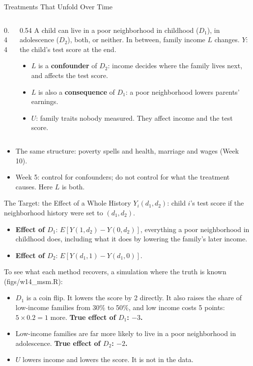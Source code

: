 \documentclass[aspectratio=169,11pt,xcolor=dvipsnames]{beamer}
\newcommand{\srcp}[1]{{\scriptsize\color{gray}(#1)}}
\begin{document}
\begin{frame}{Treatments That Unfold Over Time}
\begin{columns}[c]
\begin{column}{0.44\linewidth}
\begin{center}
\msmdag{}
\end{center}
\end{column}
\begin{column}{0.54\linewidth}
A child can live in a poor neighborhood in childhood ($D_1$), in adolescence ($D_2$), both, or
neither. In between, family income $L$ changes. $Y$: the child's test score at the end.
\begin{itemize}\itemsep2pt
  \item $L$ is a \textbf{confounder} of $D_2$: income decides where the family lives next, and
        affects the test score.
  \item $L$ is also a \textbf{consequence} of $D_1$: a poor neighborhood lowers parents' earnings.
  \item $U$: family traits nobody measured. They affect income and the test score.
\end{itemize}
\end{column}
\end{columns}
\begin{itemize}\itemsep2pt
  \item The same structure: poverty spells and health, marriage and wages (Week 10).
  \item Week 5: control for confounders; do not control for what the treatment causes. Here $L$ is both.
\end{itemize}
\end{frame}

\begin{frame}{The Target: the Effect of a Whole History}
$Y_i(d_1, d_2)$: child $i$'s test score if the neighborhood history were set to $(d_1, d_2)$.
\begin{itemize}\itemsep5pt
  \item \textbf{Effect of $D_1$}: $E[Y(1, d_2) - Y(0, d_2)]$, everything a poor neighborhood in
        childhood does, including what it does by lowering the family's later income.
  \item \textbf{Effect of $D_2$}: $E[Y(d_1, 1) - Y(d_1, 0)]$.
\end{itemize}
\vskip4pt
To see what each method recovers, a simulation where the truth is known \srcp{figs/w14\_msm.R}:
\begin{itemize}\itemsep5pt
  \item $D_1$ is a coin flip. It lowers the score by 2 directly. It also raises the share of
        low-income families from 30\% to 50\%, and low income costs 5 points: $5 \times 0.2 = 1$
        more. \textbf{True effect of $D_1$: $-3$.}
  \item Low-income families are far more likely to live in a poor neighborhood in adolescence.
        \textbf{True effect of $D_2$: $-2$.}
  \item $U$ lowers income and lowers the score. It is not in the data.
\end{itemize}
\end{frame}
\end{document}
